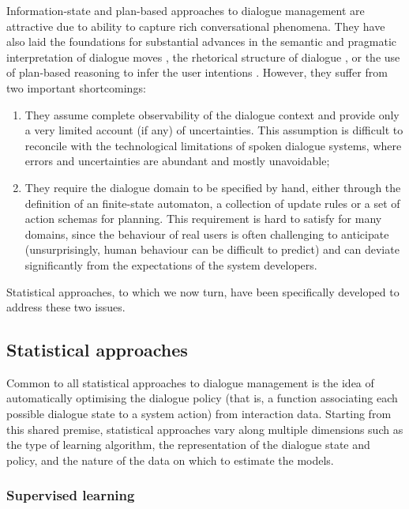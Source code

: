 Information-state and plan-based approaches to dialogue management are attractive due to ability to capture rich conversational phenomena.  They have also laid the foundations for substantial advances in the semantic and pragmatic interpretation of dialogue moves \citep{ThomasonManuscript-THOEUA,Ginzburg2012}, the rhetorical structure of dialogue \citep{0521659515}, or the use of plan-based reasoning to infer the user intentions \citep{Allen1980,Litman87}.  However, they suffer from two important shortcomings: \begin{enumerate}
\item They assume complete observability of the dialogue context and provide only a very limited account (if any) of uncertainties. This assumption is difficult to reconcile with the technological limitations of spoken dialogue systems, where errors and uncertainties are abundant and mostly unavoidable;
\item They require the dialogue domain to be specified by hand, either through the definition of an finite-state automaton, a collection of update rules or a set of action schemas for planning.  This requirement is hard to satisfy for many domains, since the behaviour of real users is often challenging to anticipate (unsurprisingly, human behaviour can be difficult to predict) and can deviate significantly from the expectations of the system developers. 
\end{enumerate}

Statistical approaches, to which we now turn, have been specifically developed to address these two issues.

\subsection{Statistical approaches}

Common to all statistical approaches to dialogue management is the idea of automatically optimising the dialogue policy (that is, a function associating each possible dialogue state to a system action) from interaction data.  Starting from this shared premise, statistical approaches vary along multiple dimensions such as the type of learning algorithm, the representation of the dialogue state and policy, and the nature of the data on which to estimate the models.

\subsubsection*{Supervised learning}

